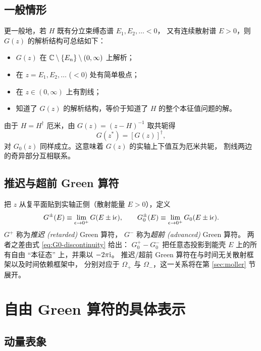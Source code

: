 \subsection{一般情形}

更一般地，若 $H$ 既有分立束缚态谱 $E_1,E_2,\dots<0$，
又有连续散射谱 $E>0$，则 $G(z)$ 的解析结构可总结如下：
\begin{itemize}
  \item $G(z)$ 在 $\mathbb{C}\setminus\{E_n\}\setminus(0,\infty)$ 上解析；
  \item 在 $z=E_1,E_2,\dots$ ($<0$) 处有简单极点；
  \item 在 $z\in(0,\infty)$ 上有割线；
  \item 知道了 $G(z)$ 的解析结构，等价于知道了 $H$ 的整个本征值问题的解。
\end{itemize}

\begin{proposition}[厄米性质带来的对称性]
由于 $H=H^\dagger$ 厄米，由 $G(z)=(z-H)^{-1}$ 取共轭得
\begin{equation}\label{eq:G-conjugation}
  G(z^*) = [G(z)]^\dagger,
\end{equation}
对 $G_0(z)$ 同样成立。这意味着 $G(z)$ 的实轴上下值互为厄米共轭，
割线两边的奇异部分互相联系。
\end{proposition}

\subsection{推迟与超前 Green 算符}

把 $z$ 从复平面贴到实轴正侧（散射能量 $E>0$），定义
\begin{equation}\label{eq:Gpm-def}
  G^\pm(E) \equiv \lim_{\epsilon\to 0^+} G(E\pm\mathrm{i}\epsilon),
  \qquad
  G_0^\pm(E) \equiv \lim_{\epsilon\to 0^+} G_0(E\pm\mathrm{i}\epsilon).
\end{equation}
$G^+$ 称为\emph{推迟 (retarded)} Green 算符，
$G^-$ 称为\emph{超前 (advanced)} Green 算符。
两者之差由式 \eqref{eq:G0-discontinuity} 给出：
$G_0^+ - G_0^-$ 把任意态投影到能壳 $E$ 上的所有自由
``本征态'' 上，并乘以 $-2\pi\mathrm{i}$。
推迟/超前 Green 算符在与时间无关散射框架以及时间依赖框架中，
分别对应于 $\Omega_+$ 与 $\Omega_-$，这一关系将在第 \ref{sec:moller} 节展开。

\section{自由 Green 算符的具体表示}

\subsection{动量表象}

